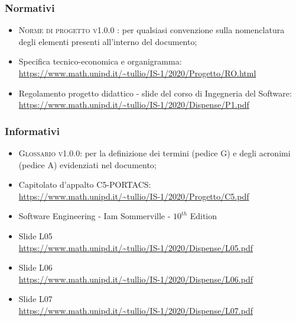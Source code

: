 \subsubsection{Normativi}

\begin{itemize}
	\item \textsc{Norme di progetto v1.0.0 }: per qualsiasi convenzione sulla nomenclatura degli elementi presenti all’interno del documento;
	\item Specifica tecnico-economica e organigramma: \\  \url{https://www.math.unipd.it/~tullio/IS-1/2020/Progetto/RO.html} %
	\item Regolamento progetto didattico - slide del corso di Ingegneria del Software: \\ \url{https://www.math.unipd.it/~tullio/IS-1/2020/Dispense/P1.pdf}
\end{itemize}



\subsubsection{Informativi}
\begin{itemize}
	\item \textsc{Glossario v1.0.0}: per la definizione dei termini (pedice G) e degli acronimi (pedice A) evidenziati nel documento;
	\item Capitolato d'appalto C5-PORTACS: \\
	\url{https://www.math.unipd.it/~tullio/IS-1/2020/Progetto/C5.pdf}
	\item Software Engineering - Iam Sommerville - $10^{th}$ Edition
	\item Slide L05 \\
	\url{https://www.math.unipd.it/~tullio/IS-1/2020/Dispense/L05.pdf}%
	\item Slide L06 \\
	\url{https://www.math.unipd.it/~tullio/IS-1/2020/Dispense/L06.pdf}%
	\item Slide L07 \\
	\url{https://www.math.unipd.it/~tullio/IS-1/2020/Dispense/L07.pdf}%
\end{itemize}